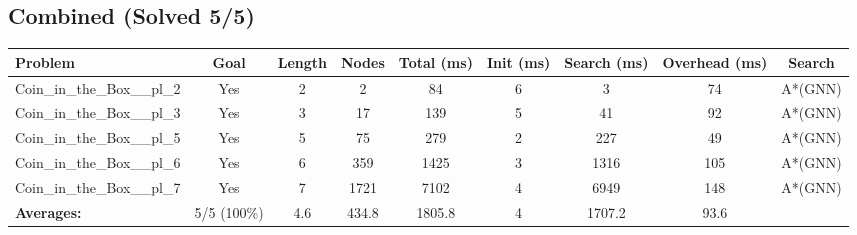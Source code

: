 \documentclass{article}
\begin{document}
\subsection*{Combined (Solved 5/5)}
\begin{tabular}{lcccccccc}
\toprule
Problem & Goal & Length & Nodes & Total (ms) & Init (ms) & Search (ms) & Overhead (ms) & Search \\
\midrule
Coin\_in\_the\_Box\_\_pl\_2 & Yes & 2 & 2 & 84 & 6 & 3 & 74 & A*(GNN) \\
Coin\_in\_the\_Box\_\_pl\_3 & Yes & 3 & 17 & 139 & 5 & 41 & 92 & A*(GNN) \\
Coin\_in\_the\_Box\_\_pl\_5 & Yes & 5 & 75 & 279 & 2 & 227 & 49 & A*(GNN) \\
Coin\_in\_the\_Box\_\_pl\_6 & Yes & 6 & 359 & 1425 & 3 & 1316 & 105 & A*(GNN) \\
Coin\_in\_the\_Box\_\_pl\_7 & Yes & 7 & 1721 & 7102 & 4 & 6949 & 148 & A*(GNN) \\
\textbf{Averages:} & 5/5 (100\%) & 4.6 & 434.8 & 1805.8 & 4 & 1707.2 & 93.6 & \\
\bottomrule
\end{tabular}
\\[0.7cm]
\end{document}
